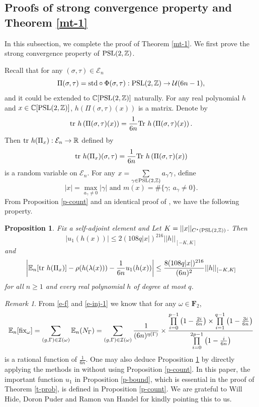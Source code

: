 \documentclass{amsart}
\theoremstyle{plain}
\newtheorem{proposition}[theorem]{Proposition}
\theoremstyle{definition}
\theoremstyle{remark}
\newtheorem*{rem*}{Remark}
\begin{document}
    \subsection{Proofs of strong convergence property and Theorem \ref{mt-1}} In this subsection, we complete the proof of Theorem \ref{mt-1}. We first prove the strong convergence property of $\textnormal{PSL}(2,\mathbb{Z})$.

    Recall that for any $(\sigma,\tau)\in\mathcal{E}_n$
    $$\Pi(\sigma,\tau)=\textnormal{std}\circ \Phi(\sigma,\tau):\textnormal{PSL}(2,\mathbb{Z})\to\mathcal{U}(6n-1),$$
    and it could be extended to $\mathbb{C}[\textnormal{PSL}(2,\mathbb{Z})]$ naturally. 
    For any real polynomial $h$ and $x\in\mathbb{C}[\textnormal{PSL}(2,\mathbb{Z})]$, $h\left(\Pi(\sigma,\tau)(x)\right)$ is a matrix. Denote by 
    $$\textnormal{tr }h\left(\Pi(\sigma,\tau)(x)\right)=\frac{1}{6n}\textnormal{Tr }h\left(\Pi(\sigma,\tau)(x)\right).$$
    Then $\textnormal{tr }h(\Pi_x):\mathcal{E}_n\to\mathbb{R}$ defined by 
    $$\textnormal{tr }h(\Pi_x)(\sigma,\tau)=\frac{1}{6n}\textnormal{Tr }h\left(\Pi(\sigma,\tau)(x)\right)$$
    is a random variable on $\mathcal{E}_n$. For any $x=\sum\limits_{\gamma\in\textnormal{PSL}(2,\mathbb{Z})}a_\gamma \gamma$, define 
    $$|x|=\max\limits_{a_\gamma\neq 0}|\gamma|\text{ and }m(x)=\#\{\gamma;\ a_{\gamma}\neq 0\}.$$
    \noindent From Proposition \ref{p-count} and an identical proof of \cite[Lemma 3.1]{MPvH25}, we have the following property.
    \begin{proposition}\label{l-rational}
       Fix  a self-adjoint element and Let $K=||x||_{  C^\star(\textnormal{PSL}(2,\mathbb{Z}))}$. Then 
       $$|u_1(h(x))|\leq 2(108q|x|)^{216}||h||_{[-K,K]}$$
       and
      $$\left|\mathbb{E}_n[\textnormal{tr }h(\Pi_x)]-\rho(h(\lambda(x)))-\frac{1}{6n}u_1(h(x))\right|\leq\frac{8(108q|x|)^{216}}{(6n)^2}||h||_{[-K,K]}$$
      for all $n\geq 1$ and every real polynomial $h$ of degree at most $q$.
      \end{proposition}
    \begin{rem*}
      
       From \eqref{e-f} and \eqref{e-inj-1} we know that for any $\omega\in\textbf{F}_2$,
       $$\mathbb{E}_n[\textnormal{fix}_\omega]=\sum\limits_{(g,\Gamma)\in\mathcal{I}(\omega)}\mathbb{E}_n(N_{\Gamma})=\sum\limits_{(g,\Gamma)\in\mathcal{I}(\omega)}\frac{1}{(6n)^{\eta(\Gamma)}}\times\frac{\prod\limits_{i=0}^{p-1}\left(1-\frac{2i}{6n}\right)\times\prod\limits_{i=1}^{q-1}\left(1-\frac{3i}{6n}\right)}{\prod\limits_{i=0}^{2p-1}\left(1-\frac{i}{6n}\right)}$$
       is a rational function of $\frac{1}{6n}$.
       One may also deduce Proposition \ref{l-rational} by directly applying the methods in \cite{CGVTvH24} without using Proposition \ref{p-count}. In this paper, the important function $u_1$ in Proposition \ref{p-bound}, which is essential in the proof of Theorem \ref{t-prob}, is defined in Proposition \ref{p-count}. We are grateful to Will Hide, Doron Puder and Ramon van Handel for kindly pointing this to us.
    \end{rem*}
\end{document}
